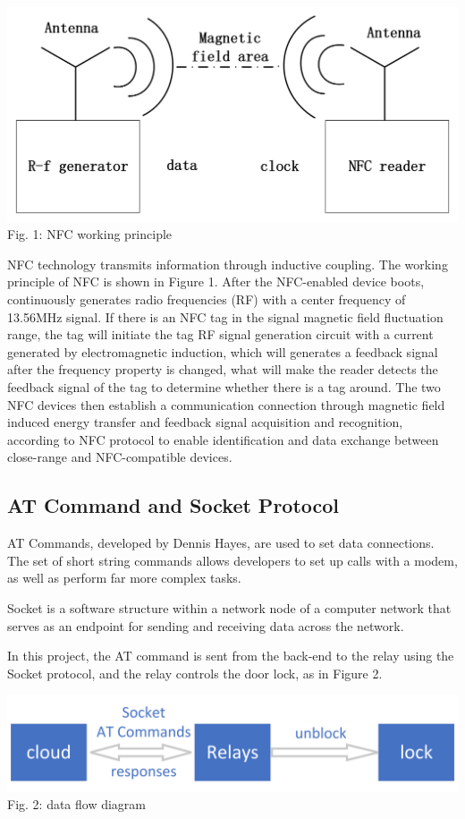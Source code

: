 \documentclass[11pt, a4paper]{article}
\begin{document}
\begin{center}
\includegraphics[scale=0.4]{pic1.png}
\\
Fig. 1: NFC working principle
\end{center}

NFC technology transmits information through inductive coupling. The working principle of NFC is shown in Figure 1. After the NFC-enabled device boots, continuously generates radio frequencies (RF) with a center frequency of 13.56MHz signal. If there is an NFC tag in the signal magnetic field fluctuation range, the tag will initiate the tag RF signal generation circuit with a current generated by electromagnetic induction, which will generates a feedback signal after the frequency property is changed, what will make the   reader detects the feedback signal of the tag to determine whether there is a tag around. The two NFC devices then establish a communication connection through magnetic field induced energy transfer and feedback signal acquisition and recognition, according to NFC protocol to enable identification and data exchange between close-range and NFC-compatible devices.

\subsection{AT Command and Socket Protocol}
AT Commands, developed by Dennis Hayes, are used to set data connections. The set of short string commands allows developers to set up calls with a modem, as well as perform far more complex tasks.

Socket is a software structure within a network node of a computer network that serves as an endpoint for sending and receiving data across the network.

In this project, the AT command is sent from the back-end to the relay using the Socket protocol, and the relay controls the door lock, as in Figure 2.
\begin{center}
\includegraphics[scale=0.2]{pic2.png}
\\
Fig. 2: data flow diagram
\end{center}
\end{document}
